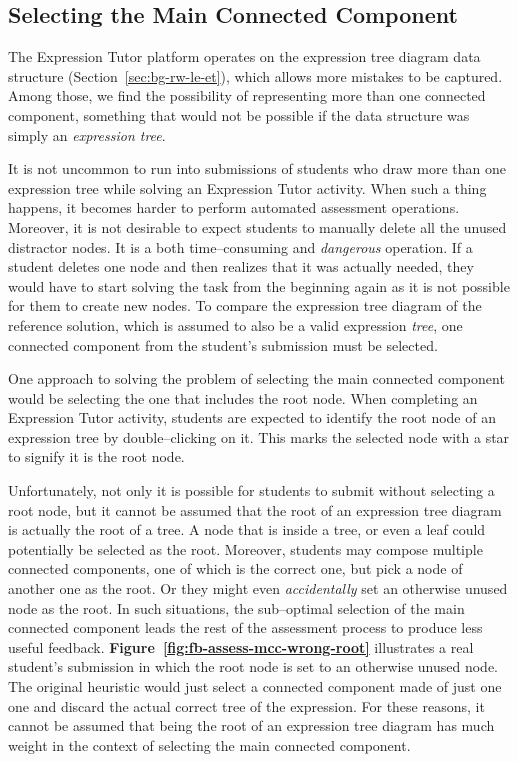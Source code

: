 \begin{chapterBody}
\subsection{Selecting the Main Connected Component}\label{sec:fb-assess-mc}

The Expression Tutor platform operates on the expression tree diagram data 
structure \hfill\break (Section~\ref{sec:bg-rw-le-et}), which allows more
mistakes to be captured.
Among those, we find the possibility of representing more than one connected
component, something that would not be possible if the data structure was simply
an \textit{expression tree}.

It is not uncommon to run into  submissions of students who draw more than one
expression tree while solving an Expression Tutor activity. When such a thing
happens, it becomes harder to perform automated assessment operations.
Moreover, it is not desirable to expect students to manually delete all the
unused distractor nodes. It is a both time–consuming and \textit{dangerous}
operation. If a student deletes one node and then realizes that it was actually
needed, they would have to start solving the task from the beginning again as it
is not possible for them to create new nodes.
To compare the expression tree diagram of the reference solution, which is
assumed to also be a valid expression \emph{tree}, one connected component from
the student's submission  must be selected.

One approach to solving the problem of selecting the main connected component
would be selecting the one that includes the root node.
When completing an Expression Tutor activity, students are expected to identify
the root node of an expression tree by double–clicking on it. This marks the
selected node with a star to signify it is the root node.

Unfortunately, not only it is possible for students to submit without selecting
a root node, but it cannot be assumed that the root of an expression tree
diagram is actually the root of a tree.
A node that is inside a tree, or even a leaf could potentially be selected as
the root.
Moreover, students may compose multiple connected components, one of which is the
correct one, but pick a node of another one as the root.
Or they might even \textit{accidentally} set an otherwise unused node as the
root. In such situations, the sub–optimal selection of the main connected
component leads the rest of the assessment process to produce less useful
feedback.
\textbf{Figure~\ref{fig:fb-assess-mcc-wrong-root}} illustrates a real student's
submission in which the root node is set to an otherwise unused node. The
original heuristic would just select a connected component made of just one one
and discard the actual correct tree of the expression.
For these reasons, it cannot be assumed that being the root of an expression tree
diagram has much weight in the context of selecting the main connected component.


\end{chapterBody}
